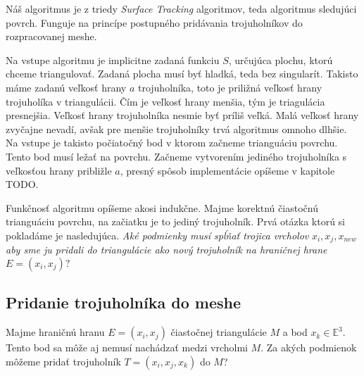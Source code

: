 Náš algoritmus je z triedy \textit{Surface Tracking} algoritmov, teda algoritmus sledujúci povrch.
Funguje na princípe postupného pridávania trojuholníkov do rozpracovanej meshe.

Na vstupe algoritmu je implicitne zadaná funkciu $S$, určujúca plochu, ktorú chceme triangulovať. 
Zadaná plocha musí byť hladká, teda bez singularít.
Takisto máme zadanú veľkosť hrany $a$ trojuholníka, toto je priližná veľkosť hrany trojuholíka v 
triangulácii. Čím je veľkosť hrany menšia, tým je triagulácia presnejšia. Veľkosť hrany trojuholníka 
nesmie byť príliš veľká. Malá veľkosť hrany zvyčajne nevadí, avšak pre menšie trojuholníky trvá 
algoritmus omnoho dlhšie. Na vstupe je takisto počiatočný bod v ktorom začneme trianguáciu povrchu.
Tento bod musí ležať na povrchu.
Začneme vytvorením jediného trojuholníka s veľkosťou hrany približle $a$, presný spôsob implementácie
opíšeme v kapitole TODO.

Funkčnosť algoritmu opíšeme akosi indukčne. Majme korektnú čiastočnú trianguáciu povrchu, na začiatku
je to jediný trojuholník. Prvá otázka ktorú si pokladáme je nasledujúca. 
\textit{Aké podmienky musí spĺňať trojica vrcholov} $x_i, x_j, x_{new}$ 
\textit{aby sme ju pridali do triangulácie ako nový trojuholník na hraničnej hrane} $E = (x_i, x_j)?$ 

\subsection{Pridanie trojuholníka do meshe}

Majme hraničnú hranu $E=(x_i, x_j)$ čiastočnej triangulácie $M$ a bod $x_k \in \mathbb{E}^3$. 
Tento bod sa môže aj nemusí nachádzať medzi vrcholmi $M$. Za akých podmienok môžeme pridať trojuholník 
$T=(x_i, x_j, x_k)$ do $M$?

